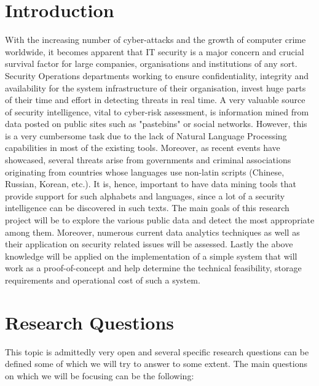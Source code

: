 \documentclass[12pt]{article}
\begin{document}
\tableofcontents

\newpage

\section*{Introduction}
With the increasing number of cyber-attacks and the growth of computer crime worldwide, it becomes apparent that IT security is a major concern and crucial survival factor for large companies, organisations and institutions of any sort. Security Operations departments working to ensure confidentiality, integrity and availability for the system infrastructure of their organisation, invest huge parts of their time and effort in detecting threats in real time. A very valuable source of security intelligence, vital to cyber-risk assessment, is information mined from data posted on public sites such as "pastebins" or social networks. However, this is a very cumbersome task due to the lack of Natural Language Processing capabilities in most of the existing tools. Moreover, as recent events have showcased, several threats arise from governments and criminal associations originating from countries whose languages use non-latin scripts (Chinese, Russian, Korean, etc.). It is, hence, important to have data mining tools that provide support for such alphabets and languages, since a lot of a security intelligence can be discovered in such texts. The main goals of this research project will be to explore the various public data and detect the most appropriate among them. Moreover, numerous current data analytics techniques as well as their application on security related issues will be assessed. Lastly the above knowledge will be applied on the implementation of a simple system that will work as a proof-of-concept and help determine the technical feasibility, storage requirements and operational cost of such a system.  

\section{Research Questions}
This topic is admittedly very open and several specific research questions can be defined some of which we will try to answer to some extent. The main questions on which we will be focusing can be the following:
\end{document}
